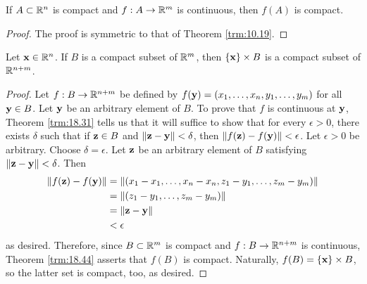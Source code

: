 \documentclass[../main.tex]{subfiles}
\begin{document}
\begin{theorem}\label{trm:18.44}
    If $A\subset\mathbb{R}^n$ is compact and $f:A\to\mathbb{R}^m$ is continuous, then $f(A)$ is compact.
    \begin{proof}
        The proof is symmetric to that of Theorem \ref{trm:10.19}.
    \end{proof}
\end{theorem}

\begin{corollary}\label{cly:18.45}
    Let $\mathbf{x}\in\mathbb{R}^n$. If $B$ is a compact subset of $\mathbb{R}^m$, then $\{\mathbf{x}\}\times B$ is a compact subset of $\mathbb{R}^{n+m}$.
    \begin{proof}
        Let $f:B\to\mathbb{R}^{n+m}$ be defined by $f(\mathbf{y})=(x_1,\dots,x_n,y_1,\dots,y_m)$ for all $\mathbf{y}\in B$. Let $\mathbf{y}$ be an arbitrary element of $B$. To prove that $f$ is continuous at $\mathbf{y}$, Theorem \ref{trm:18.31} tells us that it will suffice to show that for every $\epsilon>0$, there exists $\delta$ such that if $\mathbf{z}\in B$ and $\norm{\mathbf{z}-\mathbf{y}}<\delta$, then $\norm{f(\mathbf{z})-f(\mathbf{y})}<\epsilon$. Let $\epsilon>0$ be arbitrary. Choose $\delta=\epsilon$. Let $\mathbf{z}$ be an arbitrary element of $B$ satisfying $\norm{\mathbf{z}-\mathbf{y}}<\delta$. Then
        \begin{align*}
            \norm{f(\mathbf{z})-f(\mathbf{y})} &= \norm{(x_1-x_1,\dots,x_n-x_n,z_1-y_1,\dots,z_m-y_m)}\\
            &= \norm{(z_1-y_1,\dots,z_m-y_m)}\\
            &= \norm{\mathbf{z}-\mathbf{y}}\\
            &< \epsilon
        \end{align*}
        as desired. Therefore, since $B\subset\mathbb{R}^m$ is compact and $f:B\to\mathbb{R}^{n+m}$ is continuous, Theorem \ref{trm:18.44} asserts that $f(B)$ is compact. Naturally, $f(B)=\{\mathbf{x}\}\times B$, so the latter set is compact, too, as desired.
    \end{proof}
\end{corollary}
\end{document}
